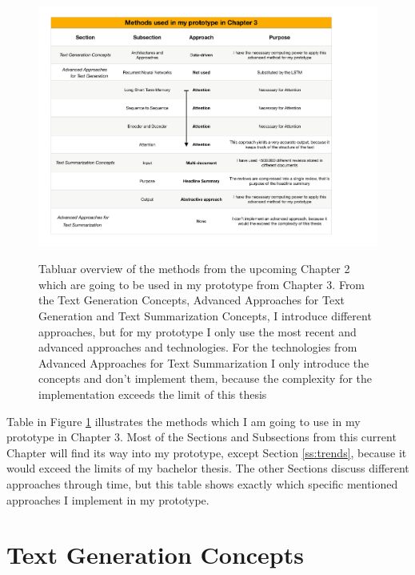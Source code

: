 \begin{figure}
	\begin{center}
		\includegraphics[width=6.5in]{photos/used_methods.pdf}\\
		\caption{Tabluar overview of the methods from the upcoming Chapter 2 which are going to be used in my prototype from Chapter 3. From the Text Generation Concepts, Advanced Approaches for Text Generation and Text Summarization Concepts, I introduce different approaches, but for my prototype I only use the most recent and advanced approaches and technologies. For the technologies from Advanced Approaches for Text Summarization I only introduce the concepts and don't implement them, because the complexity for the implementation exceeds the limit of this thesis}\label{used_methods}
	\end{center}
\end{figure}

Table in Figure \ref{used_methods} illustrates the methods which I am going to use in my prototype in Chapter 3. Most of the Sections and Subsections from this current Chapter will find its way into my prototype, except Section \ref{ss:trends}, because it would exceed the limits of my bachelor thesis. The other Sections discuss different approaches through time, but this table shows exactly which specific mentioned approaches I implement in my prototype.


\section{Text Generation Concepts}\label{ss:history}

